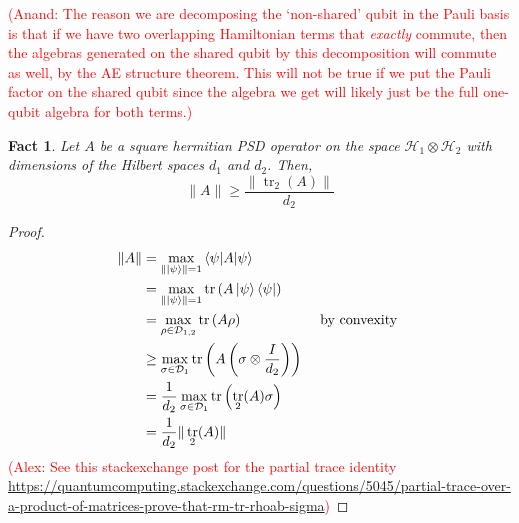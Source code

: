 \documentclass[11pt]{article}
\theoremstyle{plain}
\newtheorem{fact}[theorem]{Fact}
\DeclareMathOperator{\tr}{tr}
\newcommand{\AlexNote}[1]{\textcolor{red}{(Alex: #1)}}
\newcommand{\AnandNote}[1]{\textcolor{red}{(Anand: #1)}}
\newcommand{\AlexNote}[1]{}
\newcommand{\AnandNote}[1]{}
\begin{document}
\AnandNote{The reason we are decomposing the `non-shared' qubit in the Pauli basis is that if we have two overlapping Hamiltonian terms that \emph{exactly} commute, then the algebras generated on the shared qubit by this decomposition will commute as well, by the AE structure theorem. This will not be true if we put the Pauli factor on the shared qubit since the algebra we get will likely just be the full one-qubit algebra for both terms.}
\begin{fact} \label{fact:op-norm-ptrace}
    Let $A$ be a square hermitian PSD operator on the space $\mathcal{H}_1 \otimes \mathcal{H}_2$ with dimensions of the Hilbert spaces $d_1$ and $d_2$. Then,
    \[\|A\| \geq \frac{\|\tr_2(A)\|}{d_2}\]
\end{fact}
\begin{proof}
    \begin{align*}
        \|A\| &= \max_{\|\ket{\psi}\| = 1} \braket{\psi | A|\psi}\\
        &= \max_{\|\ket{\psi}\| = 1}\tr\left(A \ket{\psi}\bra{\psi}\right)\\
        &= \max_{\rho \in \mathcal{D}_{1,2}} \tr\left(A \rho\right) & \text{ by convexity }\\
        &\geq \max_{\sigma \in \mathcal{D}_{1}} \tr\left(A \left(\sigma \otimes \frac{I}{d_2}\right)\right)\\
        &= \frac{1}{d_2} \max_{\sigma \in \mathcal{D}_{1}} \tr\left(\tr_2(A) \sigma \right)\\
        &= \frac{1}{d_2} \|\tr_2(A)\|
    \end{align*}
\AlexNote{See this stackexchange post for the partial trace identity \url{https://quantumcomputing.stackexchange.com/questions/5045/partial-trace-over-a-product-of-matrices-prove-that-rm-tr-rhoab-sigma}}
\end{proof}
\end{document}
